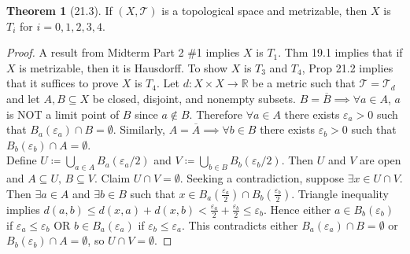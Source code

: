 \documentclass{article}
\newcommand{\R}{\ensuremath{\mathbb{R}}}
\newcommand{\ts}{topological space}
\newcommand{\es}{\ensuremath{\emptyset}}
\newcommand{\coleq}{\ensuremath{\coloneqq}}
\newcommand{\func}[3]{\ensuremath{#1: #2 \to #3}}
\newcommand{\closure}[1]{\ensuremath{\overline{#1}}}
\newcommand{\ball}[3]{\ensuremath{B_{#1}^{#2}(#3)}}
\newcommand{\tp}{\ensuremath{\mathcal{T}}}
\newcommand{\Ts}[2]{\ensuremath{(#1,#2)}}
\newcommand{\Union}{\bigcup}
\newcommand{\inter}{\cap}
\renewcommand{\Subset}{\subseteq}
\theoremstyle{definition}
\newtheorem*{thm}{Theorem}
\theoremstyle{remark}
\begin{document}
{{            \begin{thm}[21.3]
                If $\Ts{X}{\tp}$ is a \ts{} and metrizable, then $X$ is $T_i$ for $i=0,1,2,3,4$.
            \end{thm}
            
            \begin{proof}
                A result from Midterm Part 2 \#1 implies $X$ is $T_1$. Thm 19.1 implies that if $X$ is metrizable, then it is Hausdorff. To show $X$ is $T_3$ and $T_4$, Prop 21.2 implies that it suffices to prove $X$ is $T_4$. Let $\func{d}{X\times X}{\R}$ be a metric such that $\tp=\tp_d$ and let $A,B \Subset X$ be closed, disjoint, and nonempty subsets. $B=\closure{B} \implies \forall a \in A$, $a$ is NOT a limit point of $B$ since $a \notin B$. Therefore $\forall a \in A$ there exists $\varepsilon_a>0$ such that $\ball{a}{}{\varepsilon_a} \inter B= \es$. Similarly, $A=\closure{A} \implies \forall b \in B$ there exists $\varepsilon_b>0$ such that $\ball{b}{}{\varepsilon_b} \inter A=\es$.\\
                Define $U \coleq \Union_{a\in A} \ball{a}{}{\varepsilon_a/2}$ and $V\coleq \Union_{b\in B} \ball{b}{}{\varepsilon_b/2}$. Then $U$ and $V$ are open and $A \Subset U, \, B\Subset V$. Claim $U \inter V = \es$. Seeking a contradiction, suppose $\exists x \in U\inter V$. Then $\exists a \in A$ and $\exists b \in B$ such that $x\in \ball{a}{}{\frac{\varepsilon_a}{2}} \inter \ball{b}{}{\frac{\varepsilon_b}{2}}$. Triangle inequality implies $d(a,b)\leq d(x,a)+d(x,b)<\frac{\varepsilon_a}{2}+\frac{\varepsilon_b}{2}\leq \varepsilon_b$. Hence either $a\in \ball{b}{}{\varepsilon_b}$ if $\varepsilon_a\leq \varepsilon_b$ OR $b \in \ball{a}{}{\varepsilon_a}$ if $\varepsilon_b \leq \varepsilon_a$. This contradicts either $\ball{a}{}{\varepsilon_a} \inter B=\es$ or $\ball{b}{}{\varepsilon_b} \inter A =\es$, so $U \inter V=\es$.
            \end{proof}
        
        }
    
    }



        
\end{document}
